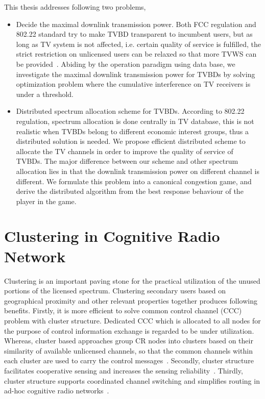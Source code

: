 This thesis addresses following two problems,
\begin{itemize}
\item Decide the maximal downlink transmission power.
Both FCC regulation and 802.22 standard try to make TVBD transparent to incumbent users, but as long as TV system is not affected, i.e. certain quality of service is fulfilled, the strict restriction on unlicensed users can be relaxed so that more TVWS can be provided~\cite{multipleIntf_pimrc11}. 
Abiding by the operation paradigm using data base, we investigate the maximal downlink transmission power for TVBDs by solving optimization problem where the cumulative interference on TV receivers is under a threshold.

\item Distributed spectrum allocation scheme for TVBDs.
According to 802.22 regulation, spectrum allocation is done centrally in TV database, this is not realistic when TVBDs belong to different economic interest groups, thus a distributed solution is needed.
We propose efficient distributed scheme to allocate the TV channels in order to improve the quality of service of TVBDs.
The major difference between our scheme and other spectrum allocation lies in that the downlink transmission power on different channel is different.
We formulate this problem into a canonical congestion game, and derive the distributed algorithm from the best response behaviour of the player in the game. 
\end{itemize}



\section{Clustering in Cognitive Radio Network}
Clustering is an important paving stone for the practical utilization of the unused portions of the licensed spectrum.
Clustering secondary users based on geographical proximity and other relevant properties together produces following benefits.
Firstly, it is more efficient to solve common control channel (CCC) problem with cluster structure.
Dedicated CCC which is allocated to all nodes for the purpose of control information exchange is regarded to be under utilization.
Whereas, cluster based approaches group CR nodes into clusters based on their similarity of available unlicensed channels, so that the common channels within each cluster are used to carry the control messages~\cite{Lazos09}.
Secondly, cluster structure facilitates cooperative sensing and increases the sensing reliability~\cite{Sun07_clustering_spectrum_secsing}.
Thirdly, cluster structure supports coordinated channel switching and simplifies routing in ad-hoc cognitive radio networks~\cite{cluster_routing_2013ICC}.


